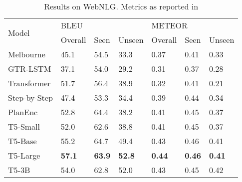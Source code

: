 \documentclass[11pt,a4paper]{article}
\begin{document}
\begin{table*}[h]
\centering
\begin{tabular}{llll||lll} \hline
\multirow{2}{*}{Model} & \multicolumn{3}{l}{BLEU} & \multicolumn{3}{l}{METEOR}                            \\ 
                       & Overall  & Seen & Unseen & Overall                  & Seen                     & Unseen                   \\ \hline
Melbourne              & 45.1     & 54.5 & 33.3   & 0.37                     & 0.41                     & 0.33                     \\
GTR-LSTM              & 37.1     & 54.0 & 29.2   & 0.31                     & 0.37                     & 0.28                     \\ \hline
Transformer            & 51.7     & 56.4 & 38.9   & 0.32                     & 0.41                     & 0.21                     \\
Step-by-Step           & 47.4     & 53.3 & 34.4   & 0.39                     & 0.44                     & 0.34                     \\
PlanEnc                & 52.8     & 64.4 & 38.2   & 0.41                     & 0.45                     & 0.37                     \\ \hline
T5-Small               & 52.0     & 62.6 & 38.8   & 0.41 & 0.45 & 0.37 \\
T5-Base                & 55.2     & 64.7 & 49.4   & 0.43 & 0.46 & 0.41 \\
T5-Large               & \textbf{57.1}     & \textbf{63.9} & \textbf{52.8}   & \textbf{0.44} & \textbf{0.46} & \textbf{0.41} \\
T5-3B                  & 54.0     & 62.8 & 52.0   & 0.43 & 0.45 & 0.42 \\ \hline
\end{tabular}
\caption{Results on WebNLG.  Metrics as reported in \citet{zhao2020bridging} }
\label{results-webnlg}
\end{table*}
\end{document}
